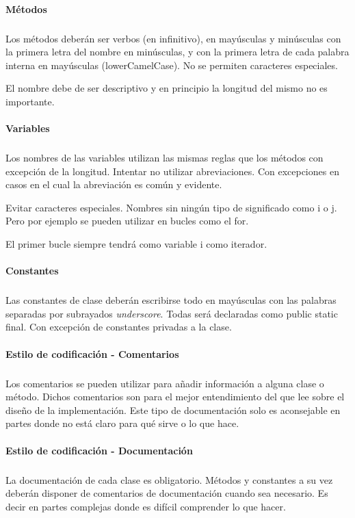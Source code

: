\paragraph{Métodos}
\subparagraph{}
Los métodos deberán ser verbos (en infinitivo), en mayúsculas y minúsculas con la primera letra del nombre en minúsculas, y con la primera letra de cada palabra interna en mayúsculas (lowerCamelCase). No se permiten caracteres especiales.

El nombre debe de ser descriptivo y en principio la longitud del mismo no es importante.

\paragraph{Variables}
\subparagraph{}
Los nombres de las variables utilizan las mismas reglas que los métodos con excepción de la longitud. Intentar no utilizar abreviaciones. Con excepciones en casos en el cual la abreviación es común y evidente. 

Evitar caracteres especiales. Nombres sin ningún tipo de significado como i  o j. Pero por ejemplo se pueden utilizar en bucles como el for. 

El primer bucle siempre tendrá como variable i como iterador.


\paragraph{Constantes}
\subparagraph{}
Las constantes de clase deberán escribirse todo en mayúsculas con las palabras separadas por subrayados \emph{underscore}. Todas será declaradas como public static final. Con excepción de constantes privadas a la clase.


\paragraph{Estilo de codificación - Comentarios}
\subparagraph{}
Los comentarios se pueden utilizar para añadir información a alguna clase o método. Dichos comentarios son para el mejor entendimiento del que lee sobre el diseño de la implementación. Este tipo de documentación solo es aconsejable en partes donde no está claro para qué sirve o lo que hace.


\paragraph{Estilo de codificación - Documentación}
\subparagraph{}
La documentación de cada clase es obligatorio. Métodos y constantes a su vez deberán disponer de comentarios de documentación cuando sea necesario. Es decir en partes complejas donde es difícil comprender lo que hacer.

